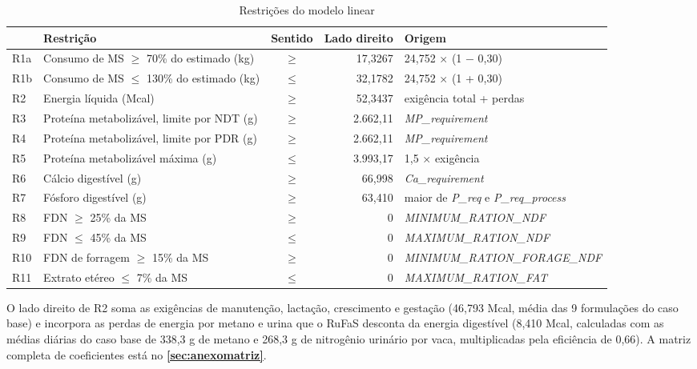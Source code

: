 \documentclass[a4paper,12pt]{article}
\begin{document}
\begin{table}[htbp]
    \centering
    \caption{Restrições do modelo linear}
    \label{tab:restricoes}
    \begin{tabular}{lL{6.2cm}cr L{3.6cm}}
        \toprule
        & \textbf{Restrição} & \textbf{Sentido} & \textbf{Lado direito} & \textbf{Origem} \\
        \midrule
        R1a & Consumo de MS $\geq$ 70\% do estimado (kg) & $\geq$ & 17,3267 & 24,752 $\times$ (1 $-$ 0,30) \\
        R1b & Consumo de MS $\leq$ 130\% do estimado (kg) & $\leq$ & 32,1782 & 24,752 $\times$ (1 + 0,30) \\
        R2 & Energia líquida (Mcal) & $\geq$ & 52,3437 & exigência total + perdas \\
        R3 & Proteína metabolizável, limite por NDT (g) & $\geq$ & 2.662,11 & \textit{MP\_\allowbreak requirement} \\
        R4 & Proteína metabolizável, limite por PDR (g) & $\geq$ & 2.662,11 & \textit{MP\_\allowbreak requirement} \\
        R5 & Proteína metabolizável máxima (g) & $\leq$ & 3.993,17 & 1,5 $\times$ exigência \\
        R6 & Cálcio digestível (g) & $\geq$ & 66,998 & \textit{Ca\_\allowbreak requirement} \\
        R7 & Fósforo digestível (g) & $\geq$ & 63,410 & maior de \textit{P\_\allowbreak req} e \textit{P\_\allowbreak req\_\allowbreak process} \\
        R8 & FDN $\geq$ 25\% da MS & $\geq$ & 0 & \textit{MINIMUM\_\allowbreak RATION\_\allowbreak NDF} \\
        R9 & FDN $\leq$ 45\% da MS & $\leq$ & 0 & \textit{MAXIMUM\_\allowbreak RATION\_\allowbreak NDF} \\
        R10 & FDN de forragem $\geq$ 15\% da MS & $\geq$ & 0 & \textit{MINIMUM\_\allowbreak RATION\_\allowbreak FORAGE\_\allowbreak NDF} \\
        R11 & Extrato etéreo $\leq$ 7\% da MS & $\leq$ & 0 & \textit{MAXIMUM\_\allowbreak RATION\_\allowbreak FAT} \\
        \bottomrule
    \end{tabular}
\end{table}

O lado direito de R2 soma as exigências de manutenção, lactação, crescimento e gestação (46,793 Mcal, média das 9 formulações do caso base) e incorpora as perdas de energia por metano e urina que o RuFaS desconta da energia digestível (8,410 Mcal, calculadas com as médias diárias do caso base de 338,3 g de metano e 268,3 g de nitrogênio urinário por vaca, multiplicadas pela eficiência de 0,66). A matriz completa de coeficientes está no \textbf{\ref{sec:anexomatriz}}.
\end{document}

